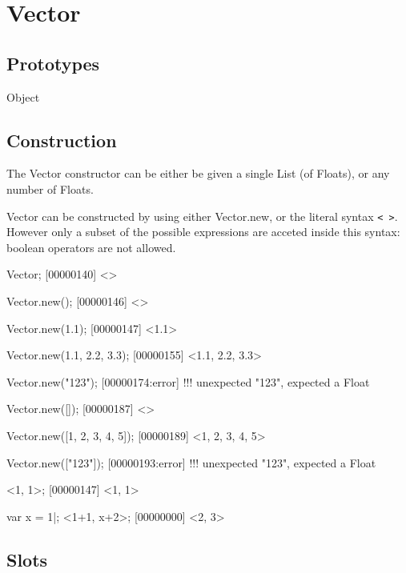
\section{Vector}

\subsection{Prototypes}
\begin{refObjects}
\item[Object]
\end{refObjects}

\subsection{Construction}

The Vector constructor can be either be given a single List (of Floats), or
any number of Floats.

Vector can be constructed by using either Vector.new, or the literal syntax
\lstinline|< >|. However only a subset of the possible expressions are
acceted inside this syntax: boolean operators are not allowed.

\begin{urbiscript}
Vector;
[00000140] <>

Vector.new();
[00000146] <>

Vector.new(1.1);
[00000147] <1.1>

Vector.new(1.1, 2.2, 3.3);
[00000155] <1.1, 2.2, 3.3>

Vector.new("123");
[00000174:error] !!! unexpected "123", expected a Float

Vector.new([]);
[00000187] <>

Vector.new([1, 2, 3, 4, 5]);
[00000189] <1, 2, 3, 4, 5>

Vector.new(["123"]);
[00000193:error] !!! unexpected "123", expected a Float

<1, 1>;
[00000147] <1, 1>

var x = 1|;
<1+1, x+2>;
[00000000] <2, 3>
\end{urbiscript}

\subsection{Slots}

